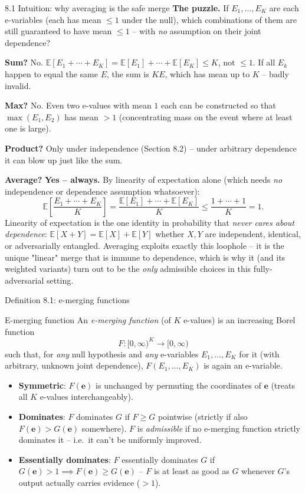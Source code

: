 \documentclass[aspectratio=169,10pt]{beamer}
\newcommand{\E}{\mathbb{E}}
\begin{document}
\begin{frame}[allowframebreaks]{8.1 Intuition: why averaging is the safe merge}
  \textbf{The puzzle.} If $E_1,\dots,E_K$ are each e-variables (each has mean $\leq 1$ under the null), which combinations of them are still guaranteed to have mean $\leq 1$ -- with \emph{no} assumption on their joint dependence?

  \vspace{0.2cm}
  \textbf{Sum?} No. $\E[E_1 + \cdots + E_K] = \E[E_1]+\cdots+\E[E_K] \leq K$, not $\leq 1$. If all $E_k$ happen to equal the same $E$, the sum is $KE$, which has mean up to $K$ -- badly invalid.

  \textbf{Max?} No. Even two e-values with mean $1$ each can be constructed so that $\max(E_1,E_2)$ has mean $>1$ (concentrating mass on the event where at least one is large).

  \textbf{Product?} Only under independence (Section 8.2) -- under arbitrary dependence it can blow up just like the sum.

  \textbf{Average?} \textbf{Yes -- always.} By linearity of expectation alone (which needs \emph{no} independence or dependence assumption whatsoever):
  \[
    \E\!\left[\frac{E_1+\cdots+E_K}{K}\right] = \frac{\E[E_1]+\cdots+\E[E_K]}{K} \leq \frac{1+\cdots+1}{K} = 1 .
  \]
  Linearity of expectation is the one identity in probability that \emph{never cares about dependence}: $\E[X+Y]=\E[X]+\E[Y]$ whether $X,Y$ are independent, identical, or adversarially entangled. Averaging exploits exactly this loophole -- it is the unique "linear" merge that is immune to dependence, which is why it (and its weighted variants) turn out to be the \emph{only} admissible choices in this fully-adversarial setting.
\end{frame}

\begin{frame}{Definition 8.1: e-merging functions}
  \begin{block}{E-merging function}
    An \emph{e-merging function} (of $K$ e-values) is an increasing Borel function
    \[
      F : [0,\infty)^K \to [0,\infty)
    \]
    such that, for \emph{any} null hypothesis and \emph{any} e-variables $E_1,\dots,E_K$ for it (with arbitrary, unknown joint dependence), $F(E_1,\dots,E_K)$ is again an e-variable.
  \end{block}
  \begin{itemize}
    \item \textbf{Symmetric}: $F(\mathbf{e})$ is unchanged by permuting the coordinates of $\mathbf{e}$ (treats all $K$ e-values interchangeably).
    \item \textbf{Dominates}: $F$ dominates $G$ if $F \geq G$ pointwise (strictly if also $F(\mathbf{e})>G(\mathbf{e})$ somewhere). $F$ is \emph{admissible} if no e-merging function strictly dominates it -- i.e.\ it can't be uniformly improved.
    \item \textbf{Essentially dominates}: $F$ essentially dominates $G$ if $G(\mathbf{e})>1 \implies F(\mathbf{e}) \geq G(\mathbf{e})$ -- $F$ is at least as good as $G$ whenever $G$'s output actually carries evidence ($>1$).
  \end{itemize}
\end{frame}
\end{document}
